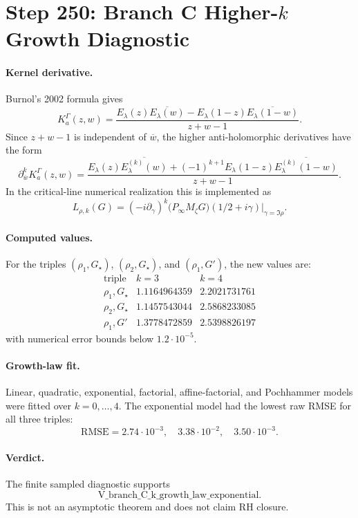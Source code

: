 \section*{Step 250: Branch C Higher-\(k\) Growth Diagnostic}

\paragraph{Kernel derivative.}
Burnol's 2002 formula gives
\[
K_a^\Gamma(z,w)=
\frac{E_\lambda(z)\overline{E_\lambda(w)}
-E_\lambda(1-z)\overline{E_\lambda(1-w)}}{z+w-1}.
\]
Since \(z+w-1\) is independent of \(\overline w\), the higher
anti-holomorphic derivatives have the form
\[
\partial_{\overline w}^{k}K_a^\Gamma(z,w)
=
\frac{
E_\lambda(z)\overline{E_\lambda^{(k)}(w)}
 + (-1)^{k+1}E_\lambda(1-z)\overline{E_\lambda^{(k)}(1-w)}
}{z+w-1}.
\]
In the critical-line numerical realization this is implemented as
\[
L_{\rho,k}(G)
=(-i\partial_\gamma)^k
\bigl(P_\infty M_\zeta G\bigr)(1/2+i\gamma)\big|_{\gamma=\Im\rho}.
\]

\paragraph{Computed values.}
For the triples \((\rho_1,G_\star)\), \((\rho_2,G_\star)\), and
\((\rho_1,G')\), the new values are:
\[
\begin{array}{c|cc}
\text{triple} & k=3 & k=4\\
\hline
\rho_1,G_\star & 1.1164964359 & 2.2021731761\\
\rho_2,G_\star & 1.1457543044 & 2.5868233085\\
\rho_1,G' & 1.3778472859 & 2.5398826197
\end{array}
\]
with numerical error bounds below \(1.2\cdot10^{-5}\).

\paragraph{Growth-law fit.}
Linear, quadratic, exponential, factorial, affine-factorial, and
Pochhammer models were fitted over \(k=0,\ldots,4\).  The exponential model
had the lowest raw RMSE for all three triples:
\[
\mathrm{RMSE}=2.74\cdot10^{-3},\quad
3.38\cdot10^{-2},\quad
3.50\cdot10^{-3}.
\]

\paragraph{Verdict.}
The finite sampled diagnostic supports
\[
\mathrm{V\_branch\_C\_k\_growth\_law\_exponential}.
\]
This is not an asymptotic theorem and does not claim RH closure.
